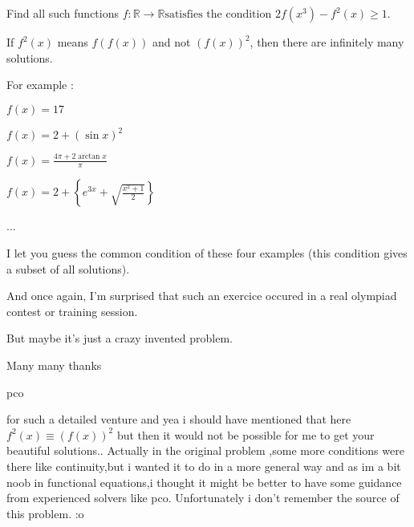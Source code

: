 \begin{solution}
	\begin{tcolorbox}Find all such functions $f:\mathbb{R} \to \mathbb{R} \text{satisfies the condition}$  $2f(x^3)-f^2(x)\geq 1$.\end{tcolorbox}
If $f^2(x)$ means $f(f(x))$ and not $(f(x))^2$, then there are infinitely many solutions.

For example : 

$f(x)=17$

$f(x)=2+(\sin x)^2$

$f(x)=\frac{4\pi+2\arctan x}{\pi}$

$f(x)=2+\left\{e^{3x}+\sqrt{\frac{x^2+1}2}\right\}$

...

I let you guess the common condition of these four examples (this condition gives a subset of all solutions).

And once again, I'm surprised that such an exercice occured in a real olympiad contest or training session.

But maybe it's just a crazy invented problem. 
\end{solution}



\begin{solution}
	Many many thanks \begin{bolded}pco\end{bolded} for such a detailed venture and yea i should have mentioned that here $f^2(x)\equiv (f(x))^2$ but then it would not be possible for me to get your beautiful solutions..
Actually in the original problem ,some more conditions were there like continuity,but i wanted it to do in a more general way and as im a bit noob in functional equations,i thought it might be better to have some guidance from experienced solvers like pco.
Unfortunately i don't remember the source of this problem. :o
\end{solution}



